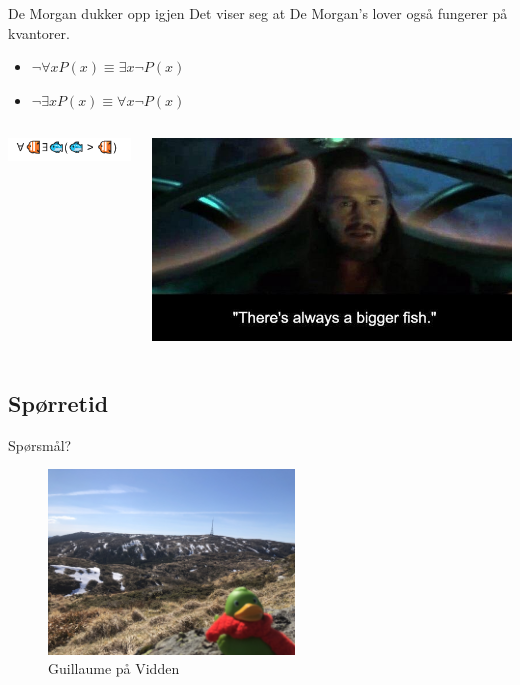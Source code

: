 \begin{frame}{De Morgan dukker opp igjen}
Det viser seg at De Morgan's lover også fungerer på kvantorer.
    \begin{itemize}
        \item $\lnot \forall x P(x) \equiv \exists x \lnot P(x)$
        \item $\lnot \exists x P(x) \equiv \forall x \lnot P(x)$
    \end{itemize}
    \begin{columns}
    \begin{column}{0.48\textwidth}
        \includegraphics[scale=1]{bigger fish.PNG}
    \end{column}
    \begin{column}{0.48\textwidth}
        \includegraphics[scale=0.3]{Always a bigger fish.jpeg}
    \end{column}
    \end{columns}
    

\end{frame}

\subsection*{Spørretid}
\begin{frame}{Spørsmål?}
    \begin{figure}
        \centering
        \includegraphics[height = 4.9cm]{images/guillaume5.jpg}
        \caption{Guillaume på Vidden}
        \label{fig:guillaume5}
    \end{figure}
\end{frame}

